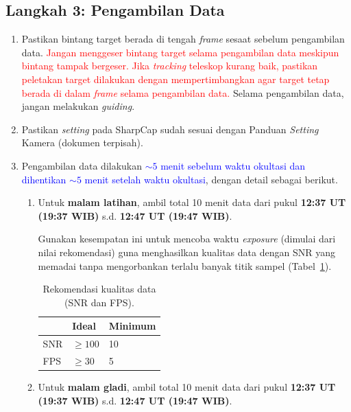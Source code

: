 \documentclass[12pt,a4paper]{article}
\begin{document}
\subsection*{Langkah 3: Pengambilan Data}
\begin{enumerate}
	\item Pastikan bintang target berada di tengah \textit{frame} sesaat sebelum pengambilan data. \textcolor{red}{Jangan menggeser bintang target selama pengambilan data meskipun bintang tampak bergeser. Jika \textit{tracking} teleskop kurang baik, pastikan peletakan target dilakukan dengan mempertimbangkan agar target tetap berada di dalam \textit{frame} selama pengambilan data.} Selama pengambilan data, jangan melakukan \textit{guiding}.
	\item Pastikan \textit{setting} pada SharpCap sudah sesuai dengan Panduan \textit{Setting} Kamera (dokumen terpisah).
	\item Pengambilan data dilakukan \textcolor{blue}{$\sim 5$ menit sebelum waktu okultasi dan dihentikan $\sim 5$ menit setelah waktu okultasi}, dengan detail sebagai berikut.
	\begin{enumerate}
		\item Untuk \textbf{malam latihan}, ambil total 10 menit data dari pukul \textbf{12:37 UT (19:37 WIB)} s.d. \textbf{12:47 UT (19:47 WIB)}.
		
		Gunakan kesempatan ini untuk mencoba waktu \textit{exposure} (dimulai dari nilai rekomendasi) guna menghasilkan kualitas data dengan SNR yang memadai tanpa mengorbankan terlalu banyak titik sampel (Tabel~\ref{tab:snrfps}).

\begin{table}[H]
	\centering
	\begin{tabular}{l l l}
		& \textbf{Ideal} & \textbf{Minimum} \\
		\hline
		SNR & $\geq 100$ & 10 \\
		FPS & $\geq 30$ & 5 \\
	\end{tabular}
	\caption{Rekomendasi kualitas data (SNR dan FPS).}
	\label{tab:snrfps}
\end{table}

\item Untuk \textbf{malam gladi}, ambil total 10 menit data dari pukul \textbf{12:37 UT (19:37 WIB)} s.d. \textbf{12:47 UT (19:47 WIB)}.
		

\end{enumerate}
\end{enumerate}
\end{document}
